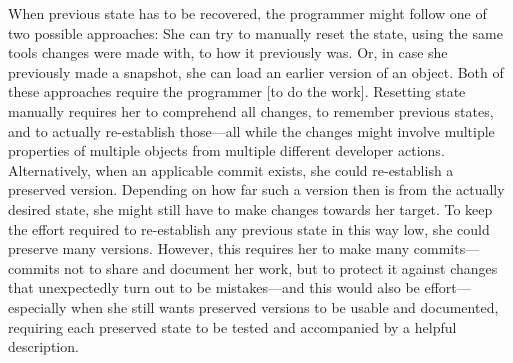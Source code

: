When previous state has to be recovered, the programmer might follow one of two possible approaches: She can try to manually reset the state, using the same tools changes were made with, to how it previously was. Or, in case she previously made a snapshot, she can load an earlier version of an object.
Both of these approaches require the programmer [to do the work].
Resetting state manually requires her to comprehend all changes, to remember previous states, and to actually re-establish those---all while the changes might involve multiple properties of multiple objects from multiple different developer actions.
Alternatively, when an applicable commit exists, she could re-establish a preserved version.
Depending on how far such a version then is from the actually desired state, she might still have to make changes towards her target.
To keep the effort required to re-establish any previous state in this way low, she could preserve many versions.
However, this requires her to make many commits---commits not to share and document her work, but to protect it against changes that unexpectedly turn out to be mistakes---and this would also be effort---especially when she still wants preserved versions to be usable and documented, requiring each preserved state to be tested and accompanied by a helpful description.



